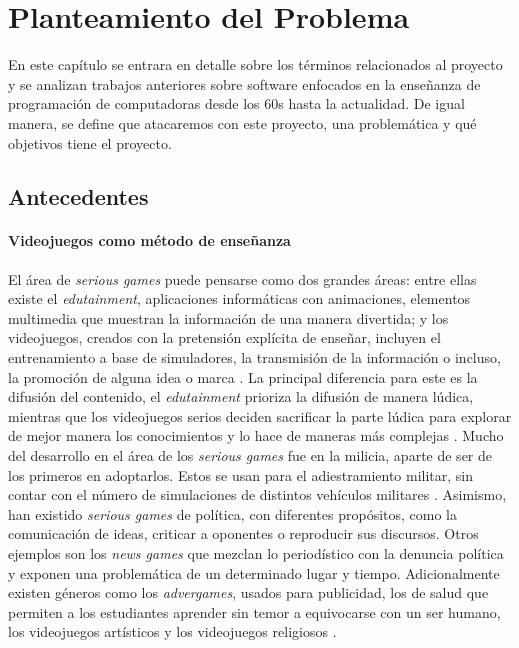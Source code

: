 \chapter{Planteamiento del Problema}
En este capítulo se entrara en detalle sobre los términos relacionados al proyecto y se analizan 
trabajos anteriores sobre software enfocados en la enseñanza de programación de computadoras desde los 
60s hasta la actualidad. De igual manera, se define que atacaremos con este proyecto, una problemática y qué objetivos tiene el proyecto.

\section{Antecedentes}

\subsubsection{Videojuegos como método de enseñanza}
El área de \textit{serious games} puede pensarse como dos grandes áreas: entre ellas existe el \textit{edutainment}, aplicaciones informáticas con animaciones, elementos multimedia que muestran la información de una manera divertida; y los videojuegos, creados con la pretensión explícita de enseñar, incluyen el entrenamiento a base de simuladores, 
la transmisión de la información o incluso, la promoción de alguna idea o marca \cite{unknown2017a}. 
La principal diferencia para este es la difusión del contenido, el \textit{edutainment} prioriza 
la difusión de manera lúdica, mientras que los videojuegos serios deciden 
sacrificar la parte lúdica para explorar de mejor manera los conocimientos y lo hace de maneras más complejas \cite{unknown2017a}.
Mucho del desarrollo en el área de los \textit{serious games} fue en la milicia, aparte de ser de los primeros en adoptarlos. Estos se usan para el adiestramiento militar, sin contar con el número de simulaciones de distintos vehículos militares \cite{unknown2017a}. 
Asimismo, han existido \textit{serious games} de política, con diferentes propósitos, como la comunicación de ideas, criticar a oponentes o reproducir sus discursos. 
Otros ejemplos son los \textit{news games} que mezclan lo periodístico con la denuncia política y exponen una problemática de un determinado lugar y tiempo. 
Adicionalmente existen géneros como los \textit{advergames}, usados para publicidad, 
los de salud que permiten a los estudiantes aprender sin temor a equivocarse con un ser humano, los videojuegos artísticos y los videojuegos religiosos \cite{unknown2017a}.

